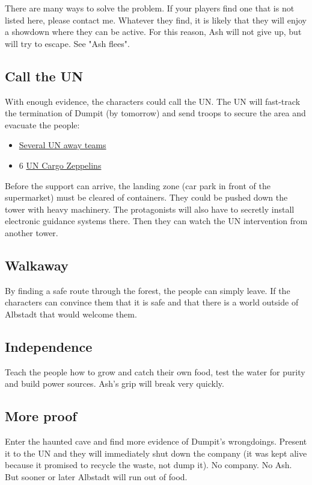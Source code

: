 There are many ways to solve the problem. If your players find one that is not listed here, please contact me. Whatever they find, it is likely that they will enjoy a showdown where they can be active. For this reason, Ash will not give up, but will try to escape. See "Ash flees".

\subsection{Call the UN}

With enough evidence, the characters could call the UN. The UN will fast-track the termination of Dumpit (by tomorrow) and send troops to secure the area and evacuate the people:

\begin{itemize}
    \item \hyperref[sec:UN away team]{Several UN away teams}
    \item 6 \hyperref[sec:UN Cargo Zeppelins]{UN Cargo Zeppelins}
\end{itemize}

Before the support can arrive, the landing zone (car park in front of the supermarket) must be cleared of containers. They could be pushed down the tower with heavy machinery. The protagonists will also have to secretly install electronic guidance systems there. Then they can watch the UN intervention from another tower.

\subsection{Walkaway}

By finding a safe route through the forest, the people can simply leave. If the characters can convince them that it is safe and that there is a world outside of Albstadt that would welcome them.

\subsection{Independence}

Teach the people how to grow and catch their own food, test the water for purity and build power sources. Ash's grip will break very quickly.

\subsection{More proof}

Enter the haunted cave and find more evidence of Dumpit's wrongdoings. Present it to the UN and they will immediately shut down the company (it was kept alive because it promised to recycle the waste, not dump it). No company. No Ash. But sooner or later Albstadt will run out of food.

